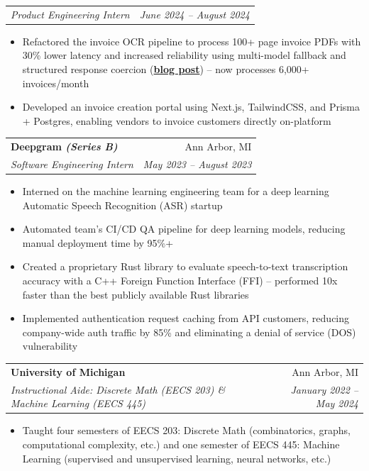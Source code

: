 \documentclass[letterpaper,11pt]{article}
\makeatletter
\newcommand{\resumeItem}[1]{
  \item\small{
    {#1 \vspace{-2pt}}
  }
}
\newcommand{\resumeSubheading}[4]{
  \vspace{-2pt}\item
    \begin{tabular*}{\textwidth}[t]{l@{\extracolsep{\fill}}r}
      \textbf{#1} & #2 \\
      \textit{\small#3} & \textit{\small #4} \\
    \end{tabular*}\vspace{-7pt}
}
\newcommand{\resumeSubSubheading}[2]{
    \item
    \begin{tabular*}{\textwidth}{l@{\extracolsep{\fill}}r}
      \textit{\small#1} & \textit{\small #2} \\
    \end{tabular*}\vspace{-7pt}
}
\newcommand{\resumeSubHeadingListEnd}{\end{itemize}}
\newcommand{\resumeItemListStart}{\begin{itemize}[leftmargin=0.25in]}
\newcommand{\resumeItemListEnd}{\end{itemize}\vspace{-5pt}}
\makeatother
\begin{document}
    \resumeSubSubheading
      {Product Engineering Intern}{June 2024 -- August 2024}
      \resumeItemListStart
        \resumeItem{Refactored the invoice OCR pipeline to process 100+ page invoice PDFs with 30\% lower latency and increased reliability using multi-model fallback and structured response coercion (\color{blue}\href{https://mercoa.com/blog/building-invoice-ocr-in-three-days-with-type-safe-llm-calls}{\textbf{blog post}}\color{black}) -- now processes 6,000+ invoices/month}
        \resumeItem{Developed an invoice creation portal using Next.js, TailwindCSS, and Prisma + Postgres, enabling vendors to invoice customers directly on-platform}
      \resumeItemListEnd
      

    \resumeSubheading
      {Deepgram \normalfont \emph{(Series B)}}{Ann Arbor, MI}
      {Software Engineering Intern}{May 2023 -- August 2023}
      \resumeItemListStart
        \resumeItem{Interned on the machine learning engineering team for a deep learning Automatic Speech Recognition (ASR) startup}
        \resumeItem{Automated team's CI/CD QA pipeline for deep learning models, reducing manual deployment time by 95\%+}
        \resumeItem{Created a proprietary Rust library to evaluate speech-to-text transcription accuracy with a C++ Foreign Function Interface (FFI) -- performed 10x faster than the best publicly available Rust libraries}
        \resumeItem{Implemented authentication request caching from API customers, reducing company-wide auth traffic by 85\% and eliminating a denial of service (DOS) vulnerability}
    \resumeItemListEnd

    \resumeSubheading
      {University of Michigan}{Ann Arbor, MI}
      {Instructional Aide: Discrete Math (EECS 203) \& Machine Learning (EECS 445)}{January 2022 -- May 2024}
      \resumeItemListStart
        \resumeItem{Taught four semesters of EECS 203: Discrete Math (combinatorics, graphs, computational complexity, etc.) and one semester of EECS 445: Machine Learning (supervised and unsupervised learning, neural networks, etc.)}
      \resumeItemListEnd
\end{document}
